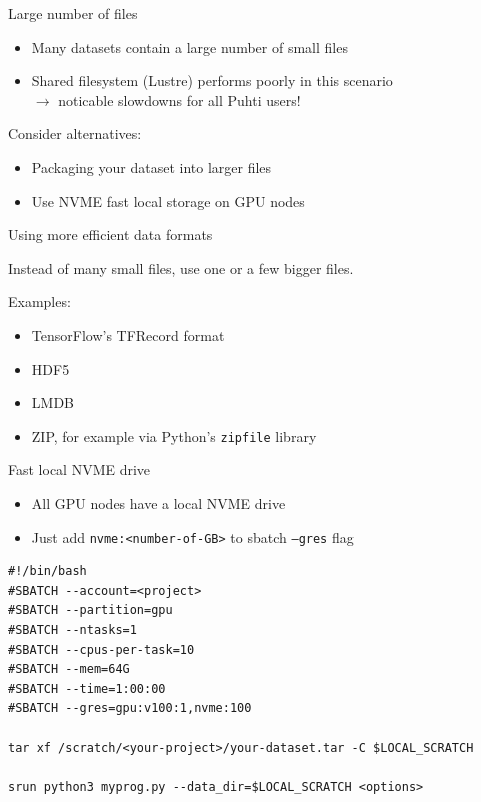 \documentclass[aspectratio=1610,14pt]{beamer}
\newcommand{\vitem}{\vfill\item}
\begin{document}
\begin{frame}{Large number of files}
  \begin{itemize}
  \vitem Many datasets contain a large number of small files
  \vitem Shared filesystem (Lustre) performs poorly in this scenario \\
    $\rightarrow$ noticable slowdowns for all Puhti users!
  \end{itemize}

  \vfill
  Consider alternatives:

  \begin{itemize}
  \vitem Packaging your dataset into larger files                     
  \vitem Use NVME fast local storage on GPU nodes
  \end{itemize}
\end{frame}

\begin{frame}{Using more efficient data formats}

  Instead of many small files, use one or a few bigger files.

  \vfill
  
  Examples:

  \begin{itemize}
  \vitem TensorFlow's TFRecord format
  \vitem HDF5
  \vitem LMDB
  \vitem ZIP, for example via Python's {\tt zipfile} library
  \end{itemize}

  \vfill
\end{frame}

\begin{frame}[fragile]{Fast local NVME drive}

  \begin{itemize}
  \item All GPU nodes have a local NVME drive
  \item Just add {\tt nvme:<number-of-GB>} to sbatch {\tt --gres} flag
  \end{itemize}

\begin{verbatim}
#!/bin/bash
#SBATCH --account=<project>
#SBATCH --partition=gpu
#SBATCH --ntasks=1
#SBATCH --cpus-per-task=10
#SBATCH --mem=64G
#SBATCH --time=1:00:00
#SBATCH --gres=gpu:v100:1,nvme:100

tar xf /scratch/<your-project>/your-dataset.tar -C $LOCAL_SCRATCH

srun python3 myprog.py --data_dir=$LOCAL_SCRATCH <options>
\end{verbatim}

\end{frame}
\end{document}
